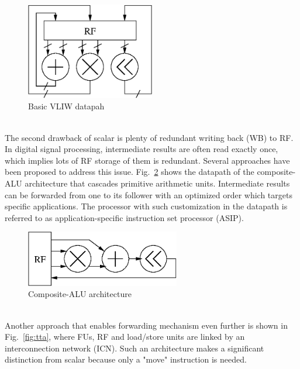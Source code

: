         \vspace{\textfig}
        \begin{figure}[!ht] 
            \centering
            \includegraphics[width=0.5\textwidth]{./figs/vliw.eps}
            \caption{Basic VLIW datapah}
            \label{fig:vliw}
        \end{figure}
        \\\indent
        The second drawback of scalar is plenty of redundant writing back (WB) to RF. 
        In digital signal processing, intermediate results are often read exactly once, which implies lots of RF storage of them is redundant.
        Several approaches have been proposed to address this issue.
        Fig.~\ref{fig:cascade} shows the datapath of the composite-ALU architecture that cascades primitive arithmetic units. 
        Intermediate results can be forwarded from one to its follower with an optimized order which targets specific applications.
        The processor with such customization in the datapath is referred to as application-specific instruction set processor (ASIP).
        \vspace{\textfig}
        \begin{figure}[!ht] 
            \centering
            \includegraphics[width=0.6\textwidth]{./figs/cascade.eps}
            \caption{Composite-ALU architecture}
            \label{fig:cascade}
        \end{figure}
        \\\indent
        Another approach that enables forwarding mechanism even further is shown in Fig.~\ref{fig:tta}, where FUs, RF and load/store units are linked by an interconnection network (ICN).
        Such an architecture makes a significant distinction from scalar because only a "move" instruction is needed. 
